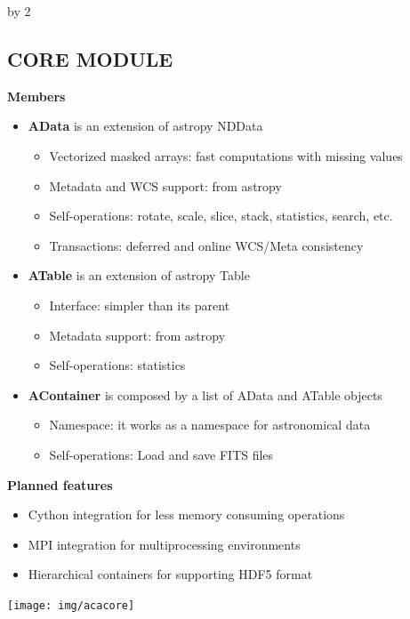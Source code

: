 \documentclass[11pt]{scrartcl}
\def\anzspalten{2}
\newlength{\kastenwidth}
\newenvironment{kasten}{
  \begin{lrbox}{\dummybox}
    \begin{minipage}{\linewidth}}
    {\end{minipage}
  \end{lrbox}
  \raisebox{-\depth}{\psshadowbox[cornersize=absolute,linearc=14pt,framesep=1em]{\usebox{\dummybox}}}\\[0.5em]}
\newenvironment{spalte}{
  \setlength\kastenwidth{1.2\textwidth}
  \divide\kastenwidth by \anzspalten
  \begin{minipage}[t]{\kastenwidth}}{\end{minipage}}
\begin{document}
\begin{lrbox}{\spalten}
{\begin{spalte}
\begin{kasten}
        \section*{\hspace{0.2cm} {\color{red} CORE MODULE} }
			\begin{minipage}{0.5\linewidth}
\textbf{Members}
\begin{itemize}
\item \textbf{AData} is an extension of astropy NDData
\begin{itemize}
\item Vectorized masked arrays: fast computations with missing values 
\item Metadata and WCS support: from astropy
\item Self-operations: rotate, scale, slice, stack, statistics, search, etc.
\item Transactions: deferred and online WCS/Meta consistency
\end{itemize}
\item \textbf{ATable} is an extension of astropy Table
\begin{itemize}
\item Interface: simpler than its parent
\item Metadata support: from astropy
\item Self-operations: statistics
\end{itemize}
\item \textbf{AContainer} is composed by a list of AData and ATable objects
\begin{itemize}
\item Namespace: it works as a namespace for astronomical data
\item Self-operations: Load and save FITS files
\end{itemize}
\end{itemize}
\textbf{Planned features} 
\begin{itemize}
\item Cython integration for less memory consuming
operations
\item MPI integration for multiprocessing environments
\item Hierarchical containers for supporting HDF5 format
\end{itemize}
			\end{minipage}
			\begin{minipage}{0.5\textwidth}
			\begin{center}
                        	\texttt{[image: img/acacore]}
			\end{center}
          \end{minipage}


\end{kasten}
\end{spalte}}
\end{lrbox}
\end{document}
